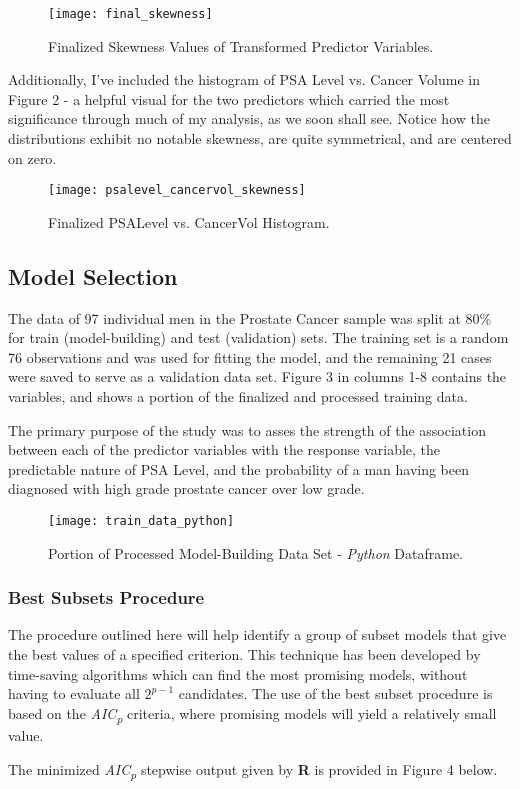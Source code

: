 \begin{figure}[H]
	\centering
	\texttt{[image: final\_skewness]}
	\caption{Finalized Skewness Values of Transformed Predictor Variables.}
\end{figure}

Additionally, I've included the histogram of PSA Level vs. Cancer Volume in Figure 2 - a helpful visual for the two predictors which carried the most significance through much of my analysis, as we soon shall see. Notice how the distributions exhibit no notable skewness, are quite symmetrical, and are centered on zero.

\begin{figure}[H]
	\centering
	\texttt{[image: psalevel\_cancervol\_skewness]}
	\caption{Finalized PSALevel vs. CancerVol Histogram.}
\end{figure}

\subsection{Model Selection}
The data of 97 individual men in the Prostate Cancer sample was split at 80\% for train (model-building) and test (validation) sets. The training set is a random 76 observations and was used for fitting the model, and the remaining 21 cases were saved to serve as a validation data set. Figure 3 in columns 1-8 contains the variables, and shows a portion of the finalized and processed training data. \par
The primary purpose of the study was to asses the strength of the association between each of the predictor variables with the response variable, the predictable nature of PSA Level, and the probability of a man having been diagnosed with high grade prostate cancer over low grade.

\begin{figure}[H]
	\centering
	\texttt{[image: train\_data\_python]}
	\caption{Portion of Processed Model-Building Data Set - \textit{Python} Dataframe.}
\end{figure}

\subsubsection{Best Subsets Procedure}
The procedure outlined here will help identify a group of subset models that give the best values of a specified criterion. This technique has been developed by time-saving algorithms which can find the most promising models, without having to evaluate all \(2^{p-1}\) candidates. The use of the best subset procedure is based on the \textit{AIC\textsubscript{p}} criteria, where promising models will yield a relatively small value. \par
The minimized \textit{AIC\textsubscript{p}} stepwise output given by \textbf{R} is provided in Figure 4 below.


